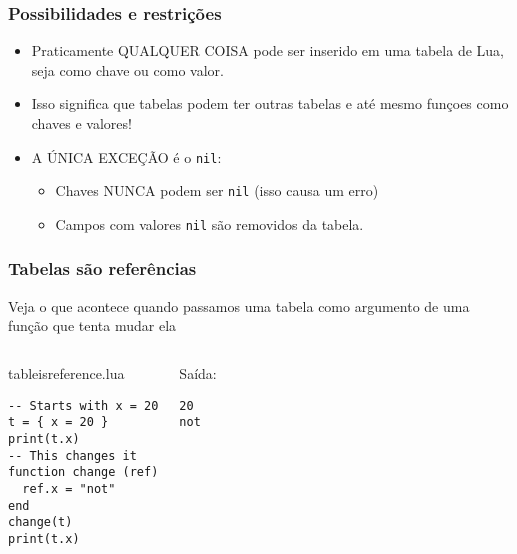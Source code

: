 \documentclass[brazil]{beamer}
\begin{document}
\begin{frame}[fragile]
  \frametitle{Possibilidades e restrições}
  \begin{itemize}
    \pause
    \item Praticamente QUALQUER COISA pode ser inserido em uma
          tabela de Lua, seja como chave ou como valor.
    \pause
    \item Isso significa que tabelas podem ter outras tabelas e
          até mesmo funçoes como chaves e valores!
    \pause
    \item A ÚNICA EXCEÇÃO é o \verb$nil$:
    \begin{itemize}
      \pause
      \item Chaves NUNCA podem ser \verb$nil$ (isso causa um erro)
      \pause
      \item Campos com valores \verb$nil$ são removidos da tabela.
    \end{itemize}
  \end{itemize}
\end{frame}
\begin{frame}[fragile]
  \frametitle{Tabelas são referências}
  \pause
  \begin{center}
    Veja o que acontece quando passamos uma tabela como
    argumento de uma função que tenta mudar ela
  \end{center}
  \pause
  \begin{columns}
      \begin{block}{tableisreference.lua}
        \begin{lstlisting}
-- Starts with x = 20
t = { x = 20 }
print(t.x)
-- This changes it
function change (ref)
  ref.x = "not"
end
change(t)
print(t.x)
        \end{lstlisting}
      \end{block}
    \pause
      \begin{block}{Saída:}
        \begin{verbatim}
20
not \end{verbatim}
      \end{block}
  \end{columns}
\end{frame}
\end{document}
